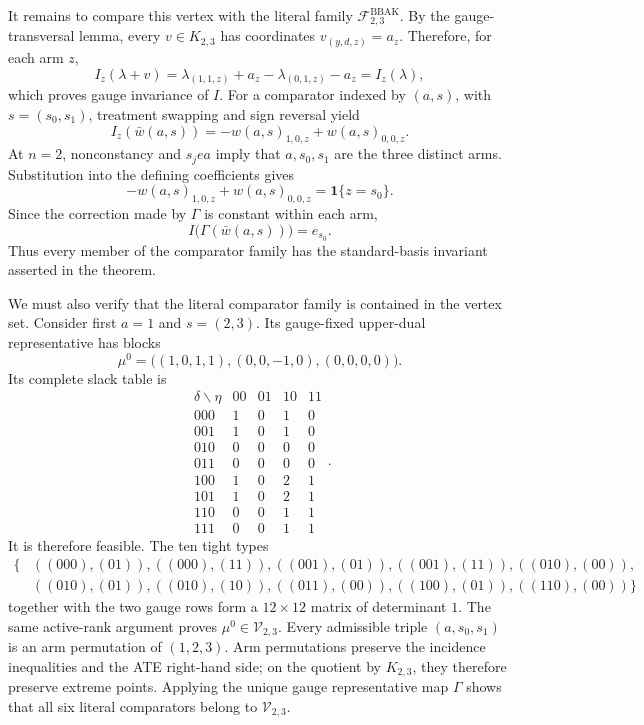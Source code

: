 It remains to compare this vertex with the literal family \(\mathcal F^{\mathrm{BBAK}}_{2,3}\). By the gauge-transversal lemma, every \(v\in K_{2,3}\) has coordinates \(v_{(y,d,z)}=a_z\). Therefore, for each arm \(z\),
\[
I_z(\lambda+v)=\lambda_{(1,1,z)}+a_z-\lambda_{(0,1,z)}-a_z=I_z(\lambda),
\]
which proves gauge invariance of \(I\). For a comparator indexed by \((a,s)\), with \(s=(s_0,s_1)\), treatment swapping and sign reversal yield
\[
I_z(\bar w(a,s))=-w(a,s)_{1,0,z}+w(a,s)_{0,0,z}.
\]
At \(n=2\), nonconstancy and \(s_j
e a\) imply that \(a,s_0,s_1\) are the three distinct arms. Substitution into the defining coefficients gives
\[
-w(a,s)_{1,0,z}+w(a,s)_{0,0,z}=\mathbf 1\{z=s_0\}.
\]
Since the correction made by \(\Gamma\) is constant within each arm,
\[
I\bigl(\Gamma(\bar w(a,s))\bigr)=e_{s_0}.
\]
Thus every member of the comparator family has the standard-basis invariant asserted in the theorem.

We must also verify that the literal comparator family is contained in the vertex set. Consider first \(a=1\) and \(s=(2,3)\). Its gauge-fixed upper-dual representative has blocks
\[
\mu^0=\bigl((1,0,1,1),(0,0,-1,0),(0,0,0,0)\bigr).
\]
Its complete slack table is
\[
\begin{array}{c|rrrr}
\delta\backslash\eta&00&01&10&11\\ \hline
000&1&0&1&0\\
001&1&0&1&0\\
010&0&0&0&0\\
011&0&0&0&0\\
100&1&0&2&1\\
101&1&0&2&1\\
110&0&0&1&1\\
111&0&0&1&1
\end{array}.
\]
It is therefore feasible. The ten tight types
\[
\begin{split}
\{&((000),(01)),((000),(11)),((001),(01)),((001),(11)),((010),(00)),\\
&((010),(01)),((010),(10)),((011),(00)),((100),(01)),((110),(00))\}
\end{split}
\]
together with the two gauge rows form a \(12\times12\) matrix of determinant \(1\). The same active-rank argument proves \(\mu^0\in\mathcal V_{2,3}\). Every admissible triple \((a,s_0,s_1)\) is an arm permutation of \((1,2,3)\). Arm permutations preserve the incidence inequalities and the ATE right-hand side; on the quotient by \(K_{2,3}\), they therefore preserve extreme points. Applying the unique gauge representative map \(\Gamma\) shows that all six literal comparators belong to \(\mathcal V_{2,3}\).

